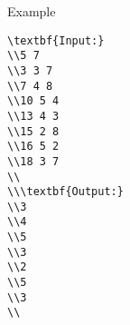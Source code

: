 Example
\begin{verbatim}
\textbf{Input:}
\\5 7
\\3 3 7
\\7 4 8
\\10 5 4
\\13 4 3
\\15 2 8
\\16 5 2
\\18 3 7
\\
\\\textbf{Output:}
\\3
\\4
\\5
\\3
\\2
\\5
\\3
\\\end{verbatim}